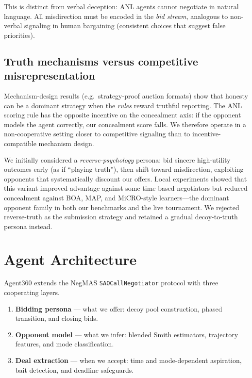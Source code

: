 \documentclass[11pt]{article}
\begin{document}
This is distinct from verbal deception: ANL agents cannot negotiate in natural language.
All misdirection must be encoded in the \emph{bid stream}, analogous to non-verbal signaling
in human bargaining (consistent choices that suggest false priorities).

\subsection{Truth mechanisms versus competitive misrepresentation}

Mechanism-design results (e.g.\ strategy-proof auction formats) show that honesty can be a
dominant strategy when the \emph{rules} reward truthful reporting.
The ANL scoring rule has the opposite incentive on the concealment axis: if the opponent models the agent correctly, our concealment score falls.
We therefore operate in a non-cooperative setting closer to competitive signaling than to
 incentive-compatible mechanism design.

We initially considered a \emph{reverse-psychology} persona: bid sincere high-utility outcomes early (as if ``playing truth''), then shift toward misdirection, exploiting opponents that systematically discount our offers.
Local experiments showed that this variant improved advantage against some time-based
negotiators but reduced concealment against BOA, MAP, and MiCRO-style learners---the dominant
opponent family in both our benchmarks and the live tournament.
We rejected reverse-truth as the submission strategy and retained a gradual decoy-to-truth
persona instead.

\section{Agent Architecture}

Agent360 extends the NegMAS \texttt{SAOCallNegotiator} protocol with three cooperating layers.

\begin{enumerate}
  \item \textbf{Bidding persona} --- what we offer: decoy pool construction, phased transition,
        and closing bids.
  \item \textbf{Opponent model} --- what we infer: blended Smith estimators, trajectory features,
        and mode classification.
  \item \textbf{Deal extraction} --- when we accept: time and mode-dependent aspiration, bait
        detection, and deadline safeguards.
\end{enumerate}
\end{document}
